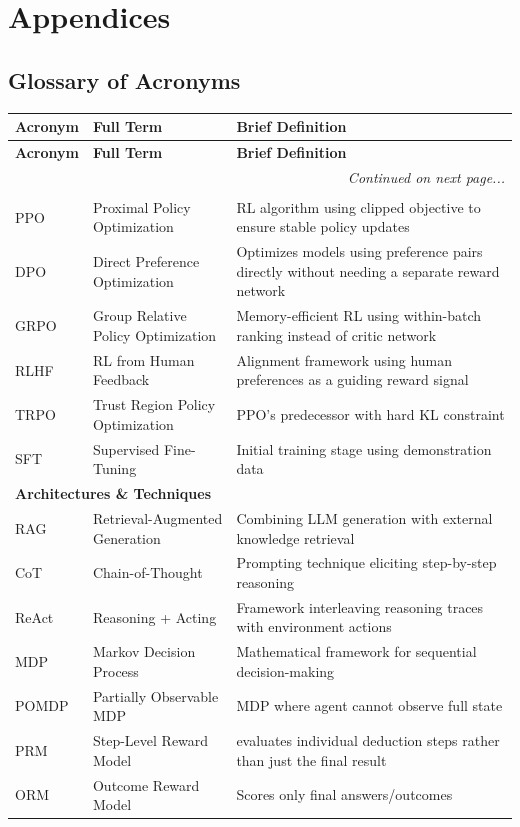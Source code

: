 \documentclass[12pt,a4paper]{report}
\theoremstyle{definition}
\begin{document}
\appendix

\part*{Appendices}

\chapter{Glossary of Acronyms}
\label{app:glossary}

\begin{longtable}{@{}p{2.5cm}p{5cm}p{7cm}@{}}
\toprule
\textbf{Acronym} & \textbf{Full Term} & \textbf{Brief Definition} \\
\midrule
\endfirsthead
\toprule
\textbf{Acronym} & \textbf{Full Term} & \textbf{Brief Definition} \\
\midrule
\endhead
\midrule
\multicolumn{3}{r}{\textit{Continued on next page...}} \\
\endfoot
\bottomrule
\endlastfoot

\multicolumn{3}{l}{\textbf{Core Algorithms}} \\
\midrule
PPO & Proximal Policy Optimization & RL algorithm using clipped objective to ensure stable policy updates \\
DPO & Direct Preference Optimization & Optimizes models using preference pairs directly without needing a separate reward network
 \\
GRPO & Group Relative Policy Optimization & Memory-efficient RL using within-batch ranking instead of critic network \\
RLHF & RL from Human Feedback & Alignment framework using human preferences as a guiding reward signal
 \\
TRPO & Trust Region Policy Optimization & PPO's predecessor with hard KL constraint \\
SFT & Supervised Fine-Tuning & Initial training stage using demonstration data \\
\midrule

\multicolumn{3}{l}{\textbf{Architectures \& Techniques}} \\
\midrule
RAG & Retrieval-Augmented Generation & Combining LLM generation with external knowledge retrieval \\
CoT & Chain-of-Thought & Prompting technique eliciting step-by-step reasoning \\
ReAct & Reasoning + Acting & Framework interleaving reasoning traces with environment actions \\
MDP & Markov Decision Process & Mathematical framework for sequential decision-making \\
POMDP & Partially Observable MDP & MDP where agent cannot observe full state \\
PRM & Step-Level Reward Model & evaluates individual deduction steps rather than just the final result \\
ORM & Outcome Reward Model & Scores only final answers/outcomes \\
\midrule


\end{longtable}
\end{document}
